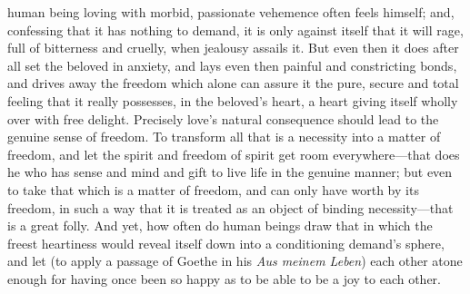 \documentclass[12pt,a4paper]{book}
\begin{document}
human being loving with morbid, passionate vehemence often feels himself;
and, confessing that it has nothing to demand, it is only against itself
that it will rage, full of bitterness and cruelly, when jealousy assails
it. But even then it does after all set the beloved in anxiety, and lays
even then painful and constricting bonds, and drives away the freedom which
alone can assure it the pure, secure and total feeling that it really
possesses, in the beloved's heart, a heart giving itself wholly over with
free delight. Precisely love's natural consequence should lead to the
genuine sense of freedom. To transform all that is a necessity into a
matter of freedom, and let the spirit and freedom of spirit get room
everywhere---that does he who has sense and mind and gift to live life in
the genuine manner; but even to take that which is a matter of freedom, and
can only have worth by its freedom, in such a way that it is treated as an
object of binding necessity---that is a great folly. And yet, how often do
human beings draw that in which the freest heartiness would reveal itself
down into a conditioning demand's sphere, and let (to apply a passage of
Goethe in his \textit{Aus meinem Leben}) each other atone enough for having
once been so happy as to be able to be a joy to each other.
\end{document}
